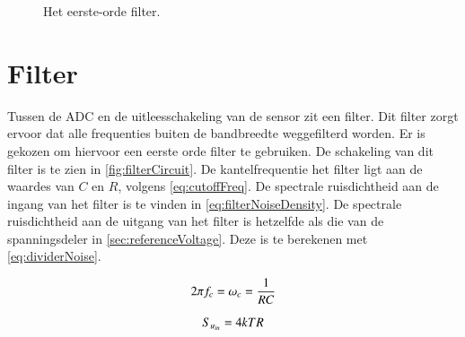 \begin{figure}[ht]
    \centering
    \def\svgwidth{0.3\textwidth}
    
    \caption{Het eerste-orde filter.}
    \label{fig:filterCircuit}
\end{figure}

\section{Filter}
Tussen de ADC en de uitleesschakeling van de sensor zit een filter. Dit filter zorgt ervoor dat alle frequenties buiten de bandbreedte weggefilterd worden. Er is gekozen om hiervoor een eerste orde filter te gebruiken.
De schakeling van dit filter is te zien in \autoref{fig:filterCircuit}. De kantelfrequentie het filter ligt aan de waardes van $C$ en $R$, volgens \autoref{eq:cutoffFreq}.
De spectrale ruisdichtheid aan de ingang van het filter is te vinden in \autoref{eq:filterNoiseDensity}.
De spectrale ruisdichtheid aan de uitgang van het filter is hetzelfde als die van de spanningsdeler in \autoref{sec:referenceVoltage}. Deze is te berekenen met \autoref{eq:dividerNoise}.


\begin{equation} \label{eq:cutoffFreq}
    2\pi f_c = \omega_c = \frac{1}{RC}
    \tagaddtext{[\si{\radian\per\second}]}
\end{equation}


\begin{equation} \label{eq:filterNoiseDensity}
    S_{u_{in}} = 4kTR
    \tagaddtext{[\si{\volt\squared\per\hertz}]}
\end{equation}



